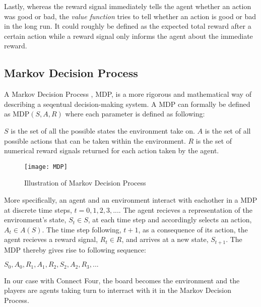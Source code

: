 \documentclass[titlepage]{article}
\begin{document}
\noindent
Lastly, whereas the reward signal immediately tells the agent whether an action was good or bad, the \emph{value function} \cite{sutton} tries to tell whether an action is good or bad in the long run. It could roughly be defined as the expected total reward after a certain action while a reward signal only informs the agent about the immediate reward. 

\subsection{Markov Decision Process}

\vskip 0.2cm

A Markov Decision Process \cite{sutton}, MDP, is a more rigorous and mathematical way of describing a seqentual decision-making system. A MDP can formally be defined as MDP$(S, A, R)$ where each parameter is defined as following:

\newpage

\begin{outline}
    \1 $S$ is the set of all the possible states the environment take on.
    \1 $A$ is the set of all possible actions that can be taken within the environment.
    \1 $R$ is the set of numerical reward signals returned for each action taken by the agent.
\end{outline}

\begin{figure}[h]
    \centering
    \texttt{[image: MDP]}
    \caption{Illustration of Markov Decision Process}
\end{figure}

\noindent
More specifically, an agent and an environment interact with eachother in a MDP at discrete time steps, $t = 0, 1, 2, 3, ...$. The agent recieves a representation of the environment's state, $S_{t} \in S$, at each time step and accordingly selects an action, $A_{t} \in A(S)$. The time step following, $t + 1$, as a consequence of its action, the agent recieves a reward signal, $R_{t} \in R$, and arrives at a new state, $S_{t+1}$. The MDP thereby gives rise to following sequence: 

\vskip 0.3cm

\centerline{$S_{0}, A_{0}, R_{1}, A_{1}, R_{2}, S_{2}, A_{2}, R_{3}, ...$}

\vskip 0.3cm

\noindent
In our case with Connect Four, the board becomes the environment and the players are agents taking turn to interract with it in the Markov Decision Process.
\end{document}
